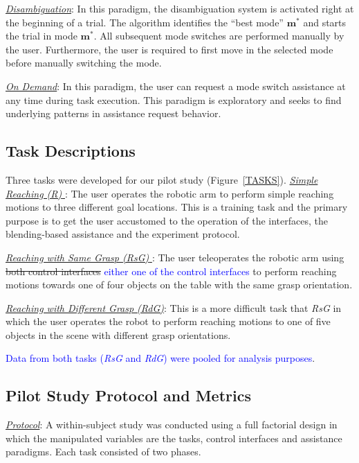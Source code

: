 \documentclass[conference]{IEEEtran}
\begin{document}
 \noindent\underline{\textit{Disambiguation}}: In this paradigm, the disambiguation system is activated right at the beginning of a trial. The algorithm identifies the ``best mode'' $\boldsymbol{m}^*$ and starts the trial in mode $\boldsymbol{m}^*$. All subsequent mode switches are performed manually by the user. Furthermore, the user is required to first move in the selected mode before manually switching the mode. 
 
 \noindent\underline{\textit{On Demand}}: In this paradigm, the user can request a mode switch assistance at any time during task execution. This paradigm is exploratory and seeks to find underlying patterns in assistance request behavior.
 
 \subsection{Task Descriptions}
 Three tasks were developed for our pilot study (Figure~\ref{TASKS}).
 \noindent\underline{\textit{Simple Reaching (R)} }: The user operates the robotic arm to perform simple reaching motions to three different goal locations. This is a training task and the primary purpose is to get the user accustomed to the operation of the interfaces, the blending-based assistance and the experiment protocol. 
 
 \noindent\underline{\textit{Reaching with Same Grasp (RsG)} }: The user teleoperates the robotic arm using \sout{both control interfaces} \textcolor{blue}{either one of the control interfaces} to perform reaching motions towards one of four objects on the table with the same grasp orientation.
 
 \noindent\underline{\textit{Reaching with Different Grasp (RdG)}}: This is a more difficult task that \textit{RsG} in which the user operates the robot to perform reaching motions to one of five objects in the scene with different grasp orientations.
 
 \textcolor{blue}{Data from both tasks (\textit{RsG} and \textit{RdG})  were pooled for analysis purposes}. 

\subsection{Pilot Study Protocol and Metrics}

\noindent\underline{\textit{Protocol}}:
A within-subject study was conducted using a full factorial design in which the manipulated variables are the tasks, control interfaces and assistance paradigms. Each task consisted of two phases. 
\end{document}
